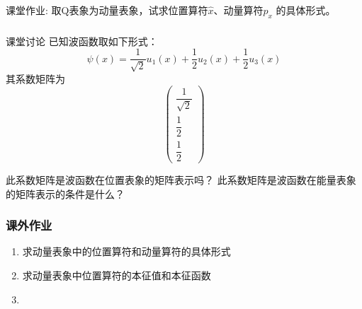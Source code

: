 \begin{frame} 
    \frametitle{}
    \begin{exampleblock}{课堂作业:}
    取Q表象为动量表象，试求位置算符$\hat{x}$、动量算符$\hat{p}_x$ 的具体形式。
    \end{exampleblock}
\end{frame} 

\begin{frame} 
    \frametitle{}
    \begin{tcolorbox2}{课堂讨论}
    已知波函数取如下形式：$$\psi(x)=\dfrac{1}{\sqrt{2}}u_1(x)+\dfrac{1}{2}u_2(x)+\dfrac{1}{2}u_3(x)$$
    其系数矩阵为$$\begin{pmatrix}
            \dfrac{1}{\sqrt{2}}\\
            \dfrac{1}{2}\\
            \dfrac{1}{2}
            \end{pmatrix}$$
    \begin{enumerate}
        \Item  此系数矩阵是波函数在位置表象的矩阵表示吗？
        \Item  此系数矩阵是波函数在能量表象的矩阵表示的条件是什么？  
    \end{enumerate}
    \end{tcolorbox2}
\end{frame} 

\begin{frame}
    \frametitle{课外作业}
    \begin{enumerate}
        \item 求动量表象中的位置算符和动量算符的具体形式
        \item 求动量表象中位置算符的本征值和本征函数
        \item 
    \end{enumerate}
\end{frame}
